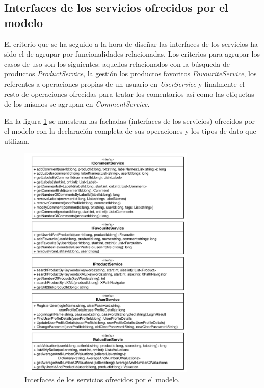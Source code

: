 \documentclass{article}
\begin{document}
	
\subsection{Interfaces de los servicios ofrecidos por el modelo}

	El criterio que se ha seguido a la hora de diseñar las interfaces de los servicios ha sido el de agrupar por funcionalidades relacionadas. Los criterios para agrupar los casos de uso son los siguientes: aquellos relacionados con la búsqueda de productos \emph{ProductService}, la gestión los productos favoritos \emph{FavouriteService}, los referentes a operaciones propias de un usuario en \emph{UserService} y finalmente el resto de operaciones ofrecidas para tratar los comentarios así como las etiquetas de los mismos se agrupan en \emph{CommentService}.
	
	En la figura \ref{fig:ServiciosModelo} se muestran las fachadas (interfaces de los servicios) ofrecidos por el modelo con la declaración completa de sus operaciones y los tipos de dato que utilizan.

\begin{figure}[h]
  \centering
    \includegraphics[width=0.75\textwidth]{img/servicios.pdf}
  \caption{Interfaces de los servicios ofrecidos por el modelo.}
  \label{fig:ServiciosModelo}
\end{figure}	
\end{document}
